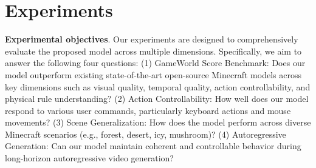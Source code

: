 \documentclass{article}
\begin{document}
\begin{table}[t]
\vspace{-0.2in}
\centering
\caption{Comparisons of Minecraft world generation in terms of the GameWorld Score benchmark. {Keyboard Acc.} and {Mouse Acc.} represent the accuracy of control signal prediction for keyboard actions and mouse-driven camera movements, respectively. {Motion smooth.} evaluates the smoothness of frame-wise motion transitions, while {Temporal Cons.} measures short-range temporal consistency. {Obj. Cons.} reflects the 3D
consistency of objects across space and time, while Scenario Cons. indicates the the consistency of scenarios across time.}
\label{table:exp_result}
\begin{threeparttable}
\end{threeparttable}
\end{table}
 


\section{Experiments}

\textbf{Experimental objectives}.  Our experiments are designed to comprehensively evaluate the proposed model across multiple dimensions. Specifically, we aim to answer the following four questions:
(1) {GameWorld Score Benchmark:} Does our model outperform existing state-of-the-art open-source Minecraft models across key dimensions such as visual quality, temporal quality, action controllability, and  physical rule understanding?
(2) {Action Controllability:} How well does our model respond to various user commands, particularly keyboard actions and mouse movements?
(3) {Scene Generalization:} How does the model perform across diverse Minecraft scenarios (e.g., forest, desert, icy, mushroom)?
(4) {Autoregressive Generation:} Can our model maintain coherent and controllable behavior during long-horizon autoregressive video generation?
\end{document}
